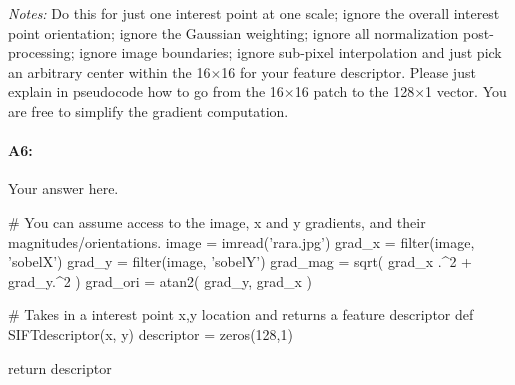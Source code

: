 \emph{Notes:} Do this for just one interest point at one scale; ignore the overall interest point orientation; ignore the Gaussian weighting; ignore all normalization post-processing; ignore image boundaries; ignore sub-pixel interpolation and just pick an arbitrary center within the 16$\times$16 for your feature descriptor. Please just explain in pseudocode how to go from the 16$\times$16 patch to the 128$\times$1 vector. You are free to simplify the gradient computation.

\paragraph{A6:} Your answer here.


\begin{python}
# You can assume access to the image, x and y gradients, and their magnitudes/orientations.
image = imread('rara.jpg')
grad_x = filter(image, 'sobelX')
grad_y = filter(image, 'sobelY')
grad_mag = sqrt( grad_x .^2 + grad_y.^2 )
grad_ori = atan2( grad_y, grad_x )

# Takes in a interest point x,y location and returns a feature descriptor
def SIFTdescriptor(x, y)
    descriptor = zeros(128,1)

    return descriptor
\end{python}




%
%








